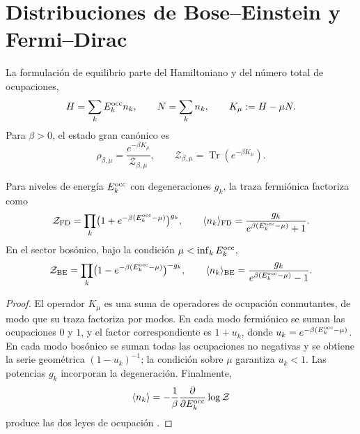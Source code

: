 \section{Distribuciones de Bose--Einstein y Fermi--Dirac}
\label{v:v:rec:ocupacion:section:02}

La formulación de equilibrio parte del Hamiltoniano y del número total de
ocupaciones,
\begin{equation}
 H=\sum_kE_k^{\rm occ} n_k,
 \qquad
 N=\sum_k n_k,
 \qquad
 K_\mu:=H-\mu N.
 \label{v:v:rec:eq:hamiltoniano-gran-canonico-rev3}
\end{equation}
Para \(\beta>0\), el estado gran canónico es
\begin{equation}
 \rho_{\beta,\mu}
 =\frac{e^{-\beta K_\mu}}{\mathcal Z_{\beta,\mu}},
 \qquad
 \mathcal Z_{\beta,\mu}
 =\operatorname{Tr}(e^{-\beta K_\mu}).
 \label{v:v:rec:eq:estado-gran-canonico-rev3}
\end{equation}

\begin{theorem}
\label{v:v:rec:thm:factorizacion-gran-canonica-rev3}
Para niveles de energía \(E_k^{\rm occ}\) con degeneraciones \(g_k\), la
traza fermiónica factoriza como
\begin{equation}
 \mathcal Z_{\rm FD}
 =\prod_k\bigl(1+e^{-\beta(E_k^{\rm occ}-\mu)}\bigr)^{g_k},
 \qquad
 \langle n_k\rangle_{\rm FD}
 =\frac{g_k}{e^{\beta(E_k^{\rm occ}-\mu)}+1}.
 \label{v:v:rec:eq:factorizacion-fd-rev3}
\end{equation}
En el sector bosónico, bajo la condición
\(\mu<\inf_kE_k^{\rm occ}\),
\begin{equation}
 \mathcal Z_{\rm BE}
 =\prod_k\bigl(1-e^{-\beta(E_k^{\rm occ}-\mu)}\bigr)^{-g_k},
 \qquad
 \langle n_k\rangle_{\rm BE}
 =\frac{g_k}{e^{\beta(E_k^{\rm occ}-\mu)}-1}.
 \label{v:v:rec:eq:factorizacion-be-rev3}
\end{equation}
\end{theorem}

\begin{proof}
El operador \(K_\mu\) es una suma de operadores de ocupación conmutantes, de
modo que su traza factoriza por modos. En cada modo fermiónico se suman las
ocupaciones \(0\) y \(1\), y el factor correspondiente es
\(1+u_k\), donde
\(u_k=e^{-\beta(E_k^{\rm occ}-\mu)}\). En cada modo bosónico se suman todas
las ocupaciones no negativas y se obtiene la serie geométrica
\((1-u_k)^{-1}\); la condición sobre \(\mu\) garantiza \(u_k<1\). Las
potencias \(g_k\) incorporan la degeneración. Finalmente,
\[
 \langle n_k\rangle
 =-\frac1\beta\frac{\partial}{\partial E_k^{\rm occ}}
   \log\mathcal Z
\]
produce las dos leyes de ocupación
\cite{v:Bose1924,v:Einstein1924,v:Fermi1926,v:Dirac1926,v:Pathria2011}.
\end{proof}

